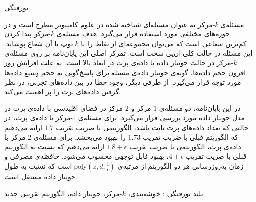 


\pagestyle{empty}

‌تورفتگی

مسئله‌ی $k$-مرکز به عنوان مسئله‌ای شناخته شده در علوم کامپیوتر مطرح است و در حوزه‌های مختلفی مورد استفاده قرار می‌گیرد. هدف مسئله‌ی $k$-مرکز پیدا کردن کم‌ترین شعاعی است که می‌توان مجموعه‌ای از نقاط را با $k$ توپ با آن شعاع پوشاند. این مسئله در حالت کلی ان‌پی-سخت است. تمرکز اصلی این پایان‌نامه بر روی مسئله‌ی $k$-مرکز در حالت جویبار داده با داده‌ی پرت در ابعاد بالا است. به علت افزایش روز افزون حجم داده‌ها، گونه‌ی جویبار داده‌ی مسئله برای پاسخ‌گویی به حجم وسیع داده‌ها مورد توجه قرار می‌گیرد. از طرفی دیگر، وجود خطا در بین داده‌های تجربی، در نظر گرفتن داده‌های پرت را پر اهمیت می‌کند.

در این پایان‌نامه، دو مسئله‌ی $1$-مرکز و $2$-مرکز در فضای اقلیدسی با داده‌ی پرت در مدل جویبار داده مورد بررسی قرار می‌گیرد. برای مسئله‌ی $1$-مرکز با داده‌ی پرت، در حالتی که تعداد داده‌های پرت ثابت باشد، الگوریتمی با ضریب تقریب $1.7$ ارائه می‌دهیم که الگوریتم قبلی با ضریب تقریب $1.73$ را بهبود می‌بخشد. برای مسئله‌ی $2$-مرکز با داده‌ی پرت، الگوریتمی با ضریب تقریب $1.8 + \epsilon$ ارائه می‌دهیم که نسبت به الگوریتم قبلی با ضریب تقریب $4 + \epsilon$، بهبود قابل توجهی محسوب می‌شود. حافظه‌ی مصرفی و زمان به‌روزرسانی هر دو الگوریتم از مرتبه‌ی $\text{poly}(z, d, \frac{1}{\epsilon})$ است که نسبت به طول جویبار داده مستقل است.

‌بلند
‌تورفتگی : 
خوشه‌بندی، $k$-مرکز، جویبار داده، الگوریتم تقریبی
‌جدید
